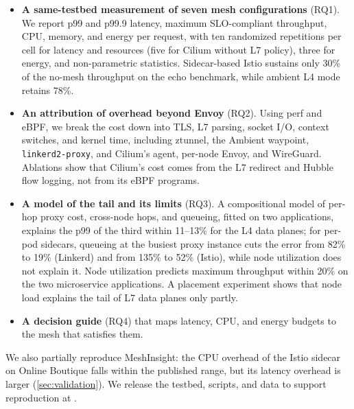 \begin{itemize}
  \item \textbf{A same-testbed measurement of seven mesh configurations}
        (RQ1). We report p99 and p99.9 latency, maximum SLO-compliant
        throughput, CPU, memory, and energy per request, with ten randomized
        repetitions per cell for latency and resources (five for Cilium
        without L7 policy), three for energy, and
        non-parametric statistics. Sidecar-based
        Istio sustains only 30\% of the no-mesh throughput on the echo
        benchmark, while ambient L4 mode retains 78\%.
  \item \textbf{An attribution of overhead beyond Envoy} (RQ2). Using perf and
        eBPF, we break the cost down into TLS, L7 parsing, socket I/O, context
        switches, and kernel time, including ztunnel, the Ambient waypoint,
        \texttt{linkerd2-proxy}, and Cilium's agent, per-node Envoy, and
        WireGuard. Ablations show that Cilium's cost comes from the L7
        redirect and Hubble flow logging, not from its eBPF programs.
  \item \textbf{A model of the tail and its limits} (RQ3). A compositional
        model of per-hop proxy cost, cross-node hops, and queueing, fitted on
        two applications, explains the p99 of the third within 11--13\% for
        the L4 data planes; for per-pod sidecars, queueing at the busiest
        proxy instance cuts the error from 82\% to 19\% (Linkerd) and from
        135\% to 52\% (Istio), while node utilization does not explain it.
        Node utilization predicts maximum throughput within 20\% on the two
        microservice applications. A placement experiment shows that node
        load explains the tail of L7 data planes only partly.
  \item \textbf{A decision guide} (RQ4) that maps latency, CPU, and energy
        budgets to the mesh that satisfies them.
\end{itemize}

We also partially reproduce MeshInsight: the CPU overhead of the Istio
sidecar on Online Boutique falls within the published range, but its latency
overhead is larger (\cref{sec:validation}). We release the testbed, scripts, and data to
support reproduction at \anonrepo.

